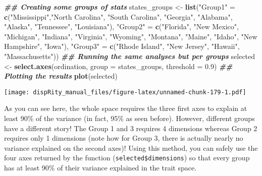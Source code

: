 \documentclass[
]{book}
\newenvironment{Shaded}{\begin{snugshade}}{\end{snugshade}}
\newcommand{\AttributeTok}[1]{\textcolor[rgb]{0.13,0.29,0.53}{#1}}
\newcommand{\DocumentationTok}[1]{\textcolor[rgb]{0.56,0.35,0.01}{\textbf{\textit{#1}}}}
\newcommand{\FloatTok}[1]{\textcolor[rgb]{0.00,0.00,0.81}{#1}}
\newcommand{\FunctionTok}[1]{\textcolor[rgb]{0.13,0.29,0.53}{\textbf{#1}}}
\newcommand{\NormalTok}[1]{#1}
\newcommand{\OtherTok}[1]{\textcolor[rgb]{0.56,0.35,0.01}{#1}}
\newcommand{\StringTok}[1]{\textcolor[rgb]{0.31,0.60,0.02}{#1}}
\begin{document}
\begin{Shaded}
\begin{Highlighting}[]
\DocumentationTok{\#\# Creating some groups of stats}
\NormalTok{states\_groups }\OtherTok{\textless{}{-}} \FunctionTok{list}\NormalTok{(}\StringTok{"Group1"} \OtherTok{=} \FunctionTok{c}\NormalTok{(}\StringTok{"Mississippi"}\NormalTok{,}\StringTok{"North Carolina"}\NormalTok{,}
                                   \StringTok{"South Carolina"}\NormalTok{, }\StringTok{"Georgia"}\NormalTok{, }\StringTok{"Alabama"}\NormalTok{,}
                                   \StringTok{"Alaska"}\NormalTok{, }\StringTok{"Tennessee"}\NormalTok{, }\StringTok{"Louisiana"}\NormalTok{),}
                      \StringTok{"Group2"} \OtherTok{=} \FunctionTok{c}\NormalTok{(}\StringTok{"Florida"}\NormalTok{, }\StringTok{"New Mexico"}\NormalTok{, }\StringTok{"Michigan"}\NormalTok{,}
                                   \StringTok{"Indiana"}\NormalTok{, }\StringTok{"Virginia"}\NormalTok{, }\StringTok{"Wyoming"}\NormalTok{, }\StringTok{"Montana"}\NormalTok{,}
                                   \StringTok{"Maine"}\NormalTok{, }\StringTok{"Idaho"}\NormalTok{, }\StringTok{"New Hampshire"}\NormalTok{, }\StringTok{"Iowa"}\NormalTok{),}
                      \StringTok{"Group3"} \OtherTok{=} \FunctionTok{c}\NormalTok{(}\StringTok{"Rhode Island"}\NormalTok{, }\StringTok{"New Jersey"}\NormalTok{, }\StringTok{"Hawaii"}\NormalTok{, }\StringTok{"Massachusetts"}\NormalTok{))}
\DocumentationTok{\#\# Running the same analyses but per groups}
\NormalTok{selected }\OtherTok{\textless{}{-}} \FunctionTok{select.axes}\NormalTok{(ordination, }\AttributeTok{group =}\NormalTok{ states\_groups, }\AttributeTok{threshold =} \FloatTok{0.9}\NormalTok{)}
\DocumentationTok{\#\# Plotting the results}
\FunctionTok{plot}\NormalTok{(selected)}
\end{Highlighting}
\end{Shaded}

\texttt{[image: dispRity\_manual\_files/figure-latex/unnamed-chunk-179-1.pdf]}

As you can see here, the whole space requires the three first axes to explain at least 90\% of the variance (in fact, 95\% as seen before).
However, different groups have a different story!
The Group 1 and 3 requires 4 dimensions whereas Group 2 requires only 1 dimensions (note how for Group 3, there is actually nearly no variance explained on the second axes)!
Using this method, you can safely use the four axes returned by the function (\texttt{selected\$dimensions}) so that every group has at least 90\% of their variance explained in the trait space.
\end{document}
